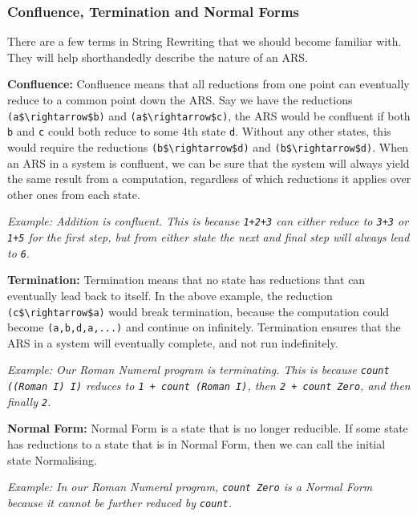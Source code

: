 \documentclass{article}
\begin{document}
        \subsubsection{Confluence, Termination and Normal Forms}
        There are a few terms in String Rewriting that we should become familiar with. They will help shorthandedly describe the nature of an ARS.
        
        \medskip\noindent
        \textbf{Confluence:} Confluence means that all reductions from one point can eventually reduce to a common point down the ARS. Say we have the reductions \lstinline{(a$\rightarrow$b)} and \lstinline{(a$\rightarrow$c)}, the ARS would be confluent if both \lstinline{b} and \lstinline{c} could both reduce to some 4th state \lstinline{d}. Without any other states, this would require the reductions \lstinline{(b$\rightarrow$d)} and \lstinline{(b$\rightarrow$d)}. When an ARS in a system is confluent, we can be sure that the system will always yield the same result from a computation, regardless of which reductions it applies over other ones from each state.
        
        \textit{Example: Addition is confluent. This is because \lstinline{1+2+3} can either reduce to \lstinline{3+3} or \lstinline{1+5} for the first step, but from either state the next and final step will always lead to \lstinline{6}}.
        
        \medskip\noindent
        \textbf{Termination:} Termination means that no state has reductions that can eventually lead back to itself. In the above example, the reduction \lstinline{(c$\rightarrow$a)} would break termination, because the computation could become \lstinline{(a,b,d,a,...)} and continue on infinitely. Termination ensures that the ARS in a system will eventually complete, and not run indefinitely.
        
        \textit{Example: Our Roman Numeral program is terminating. This is because \lstinline{count ((Roman I) I)} reduces to \lstinline{1 + count (Roman I)}, then \lstinline{2 + count Zero}, and then finally  \lstinline{2}}.
        
        \medskip\noindent
        \textbf{Normal Form:} Normal Form is a state that is no longer reducible. If some state has reductions to a state that is in Normal Form, then we can call the initial state Normalising.
        
        \textit{Example: In our Roman Numeral program, \lstinline{count Zero} is a Normal Form because it cannot be further reduced by \lstinline{count}.}
        
\end{document}
